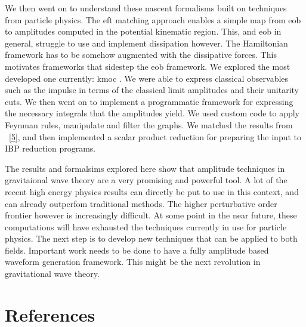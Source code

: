 \documentclass[
  11pt,
  a4paper,
  DIV=11,
  numbers=noendperiod,
  twoside]{scrreprt}
\DeclareRobustCommand{\[}{\begin{equation}}
\DeclareRobustCommand{\]}{\end{equation}}
\begin{document}
We then went on to understand these nascent formalisms built on
techniques from particle physics. The \gls{eft} matching approach
enables a simple map from \gls{eob} to amplitudes computed in the
potential kinematic region. This, and \gls{eob} in general, struggle to
use and implement dissipation however. The Hamiltonian framework has to
be somehow augmented with the dissipative forces. This motivates
frameworks that sidestep the \gls{eob} framework. We explored the most
developed one currently: \gls{kmoc} . We were able to express classical
observables such as the impulse in terms of the classical limit
amplitudes and their unitarity cuts. We then went on to implement a
programmatic framework for expressing the necessary integrals that the
amplitudes yield. We used custom code to apply Feynman rules, manipulate
and filter the graphs. We matched the results from
~{[}\protect\hyperlink{ref-Kosower:2018adc}{5}{]}, and then implemented
a scalar product reduction for preparing the input to IBP reduction
programs.

The results and formalsims explored here show that amplitude techniques
in gravitaional wave theory are a very promising and powerful tool. A
lot of the recent high energy physics results can directly be put to use
in this context, and can already outperfom traditional methods. The
higher perturbative order frontier however is increasingly difficult. At
some point in the near future, these computations will have exhausted
the techniques currently in use for particle physics. The next step is
to develop new techniques that can be applied to both fields. Important
work needs to be done to have a fully amplitude based waveform
generation framework. This might be the next revolution in gravitational
wave theory.


\hypertarget{references}{%
\chapter*{References}\label{references}}
\end{document}
